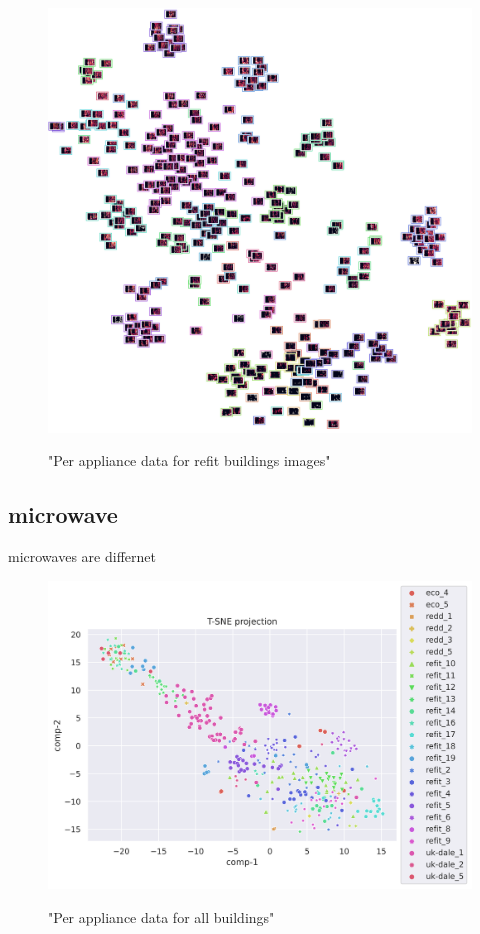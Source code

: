 \begin{figure}[H]
	\centering
	\caption{"Per appliance data for refit buildings images"}
	\includegraphics[width=.9\textwidth]{Figures/TSNE/TSNE_per_appliance/all/img_scatter_allkettle.png}
	\label{fig:tsne_pa_img_scatter_all_kettle}
\end{figure}

\subsection{microwave}
microwaves are differnet

\begin{figure}[H]
	\centering
	\caption{"Per appliance data for all buildings"}
	\includegraphics[width=1.2\textwidth]{Figures/TSNE/TSNE_per_appliance/all/scatter_all_microwave.png}
	\label{fig:tsne_pa_scatter_all_microwave}
\end{figure}

